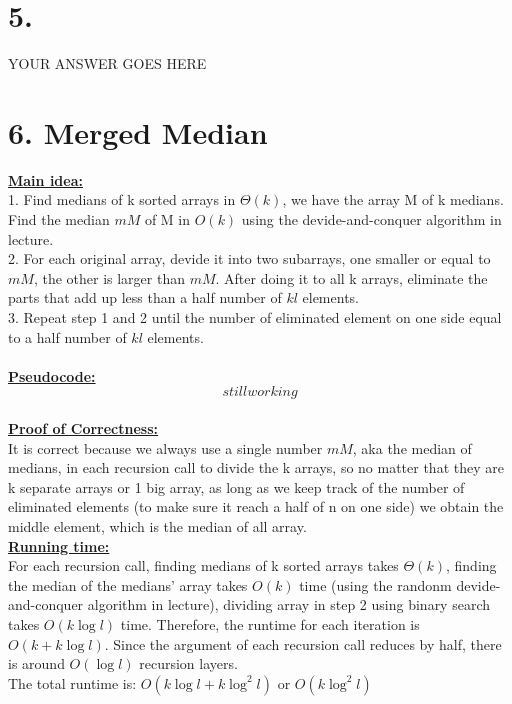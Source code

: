 \documentclass[11pt]{article}
\begin{document}
\newpage
\section*{5.}
YOUR ANSWER GOES HERE


\newpage
\section*{6. Merged Median}
\textbf{\underline{Main idea:}}\\
1. Find medians of k sorted arrays in $\Theta(k)$, we have the array M of k medians. Find the median $mM$ of M in $O(k)$ using the devide-and-conquer algorithm in lecture.\\
2. For each original array, devide it into two subarrays, one smaller or equal to $mM$, the other is larger than $mM$. After doing it to all k arrays, eliminate the parts that add up less than a half number of $kl$ elements.\\
3. Repeat step 1 and 2 until the number of eliminated element on one side equal to a half number of $kl$ elements.\\
\\
\textbf{\underline{Pseudocode:}}\\
%
\begin{equation}
still working
\end{equation}
%
\\
\textbf{\underline{Proof of Correctness:}}\\
It is correct because we always use a single number $mM$, aka the median of medians, in each recursion call to divide the k arrays, so no matter that they are k separate arrays or 1 big array, as long as we keep track of the number of eliminated elements (to make sure it reach a half of n on one side) we obtain the middle element, which is the median of all array.
\\
\textbf{\underline{Running time:}}\\
For each recursion call, finding medians of k sorted arrays takes $\Theta(k)$, finding the median of the medians' array takes $O(k)$ time (using the randonm devide-and-conquer algorithm in lecture), dividing array in step 2 using binary search takes $O(k\log l)$ time. Therefore, the runtime for each iteration is $O(k + k\log l)$.
Since the argument of each recursion call reduces by half, there is around $O(\log l)$ recursion layers.\\
The total runtime is: $O(k\log l + k\log^2 l)$ or $O(k\log^2 l)$
\end{document}
